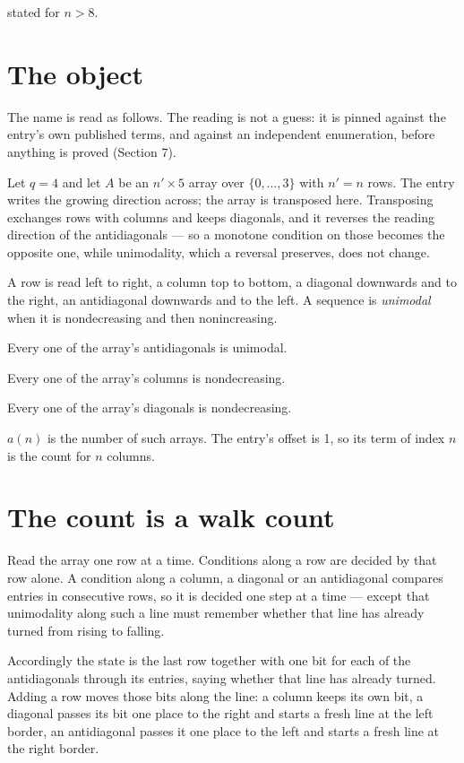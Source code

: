 \documentclass[11pt]{article}
\theoremstyle{definition}
\begin{document}
stated for $n > 8$.

\section{The object}

The name is read as follows. The reading is not a guess: it is pinned against the entry's own published terms, and against an independent enumeration, before anything is proved (Section 7).

Let $q = 4$ and let $A$ be an $n' \times 5$ array over $\{0,\dots,3\}$ with $n' = n$ rows. The entry writes the growing direction across; the array is transposed here. Transposing exchanges rows with columns and keeps diagonals, and it reverses the reading direction of the antidiagonals --- so a monotone condition on those becomes the opposite one, while unimodality, which a reversal preserves, does not change.

A row is read left to right, a column top to bottom, a diagonal downwards and to the right, an antidiagonal downwards and to the left. A sequence is {\itshape unimodal} when it is nondecreasing and then nonincreasing.

Every one of the array's antidiagonals is unimodal.

Every one of the array's columns is nondecreasing.

Every one of the array's diagonals is nondecreasing.

$a(n)$ is the number of such arrays. The entry's offset is 1, so its term of index $n$ is the count for $n$ columns.

\section{The count is a walk count}

Read the array one row at a time. Conditions along a row are decided by that row alone. A condition along a column, a diagonal or an antidiagonal compares entries in consecutive rows, so it is decided one step at a time --- except that unimodality along such a line must remember whether that line has already turned from rising to falling.

Accordingly the state is the last row together with one bit for each of the antidiagonals through its entries, saying whether that line has already turned. Adding a row moves those bits along the line: a column keeps its own bit, a diagonal passes its bit one place to the right and starts a fresh line at the left border, an antidiagonal passes it one place to the left and starts a fresh line at the right border.
\end{document}
